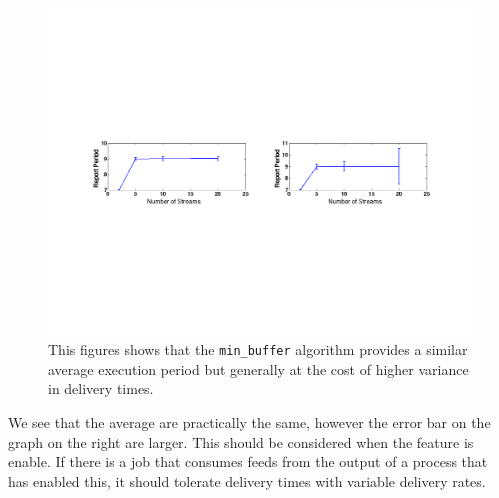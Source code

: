 \begin{figure}[th!] %
\centering
\includegraphics[width=1.0	\columnwidth]{figs/period_vs_streams}
\caption{This figures shows that the \texttt{min\_buffer} algorithm provides a similar average execution period but generally
at the cost of higher variance in delivery times.}
\label{fig:report_periods}
\end{figure}

We see that the average are practically the same, however the error bar on the graph on the right are larger.  This should be considered 
when the feature is enable.  If there is a job that consumes feeds from the output of a process that has enabled this, it should tolerate
delivery times with variable delivery rates.


